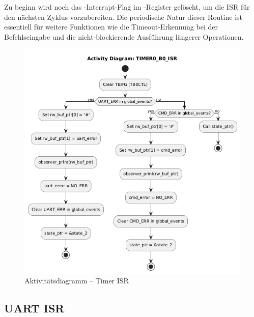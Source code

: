 \newpage
Zu beginn wird noch das -Interrupt-Flag im -Register gel\"oscht, um die ISR f\"ur den n\"achsten Zyklus vorzubereiten. Die periodische Natur dieser Routine ist essentiell f\"ur weitere Funktionen wie die Timeout-Erkennung bei der Befehlseingabe und die nicht-blockierende Ausf\"uhrung l\"angerer Operationen.

\vspace{1cm}
\begin{figure}[h!]
	\centering
	\includegraphics[width=1.0\textwidth]{../Bilder/observer_activity_diagram_timer_b0.png}
	\caption{Aktivit\"atsdiagramm -- Timer ISR}
	\label{fig:activity_diagram_timer_isr}
\end{figure}


\newpage
\subsection{UART ISR}
\label{sec:UART_ISR}


